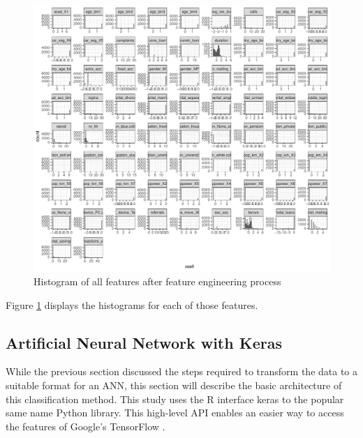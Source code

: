 \documentclass[12pt,a4paper]{article}
\newcommand{\pkg}[1]{{\normalfont\fontseries{b}\selectfont #1}}
\let\proglang=\textsf
\begin{document}
\begin{figure}[ht]
	\centering
  \includegraphics[scale=0.63]{figures/hist_all_features.pdf}
	\caption{Histogram of all features after feature engineering process}
	\label{fig_hist}
\end{figure}Figure \ref{fig_hist} displays the histograms for each
of those features.

\subsection{Artificial Neural Network with Keras}

While the previous section discussed the steps required to transform the data to a suitable format for an ANN,
this section will describe the basic architecture of this classification method.
This study uses the \proglang{R} interface \pkg{keras} \citep{cholletInterfaceKeras2017} to the popular same name \proglang{Python} library.
This high-level API enables an easier way to access the features of Google's \pkg{TensorFlow} \citep{abadiTensorFlowLargeScaleMachine2015}.
\end{document}
